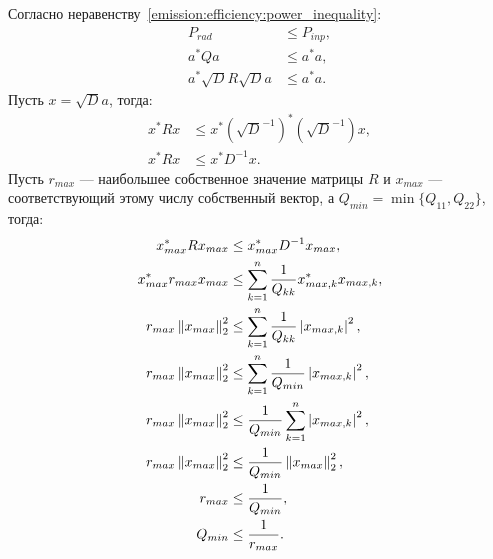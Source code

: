Согласно неравенству~\eqref{emission:efficiency:power_inequality}:
\begin{align*}
    P_{rad}                   & \le P_{inp} , \\
    a^* Q a                   & \le a^* a,    \\
    a^* \sqrt{D} R \sqrt{D} a & \le a^* a .
\end{align*}
Пусть $x = \sqrt{D} a$, тогда:
\begin{align*}
    x^* R x & \le x^* (\sqrt{D}^{-1})^* (\sqrt{D}^{-1}) x , \\
    x^* R x & \le x^* D^{-1} x .
\end{align*}
Пусть $r_{max}$ --- наибольшее собственное значение матрицы $R$ и $x_{max}$ --- соответствующий этому числу собственный вектор, а $Q_{min} = \min \{ Q_{11}, Q_{22} \}$,
тогда:
\begin{align*}
    x_{max}^* R x_{max}        & \le x_{max}^* D^{-1} x_{max} ,                             \\
    x_{max}^* r_{max} x_{max}  & \le \sum_{k=1}^n \frac{1}{Q_{kk}} x_{max,k}^* x_{max,k} ,  \\
    r_{max} \left \| x_{max} \right \|_2^2 & \le \sum_{k=1}^n \frac{1}{Q_{kk}} \left | x_{max,k} \right |^2 ,  \\
    r_{max} \left \| x_{max} \right \|_2^2 & \le \sum_{k=1}^n \frac{1}{Q_{min}} \left | x_{max,k} \right |^2 , \\
    r_{max} \left \| x_{max} \right \|_2^2 & \le \frac{1}{Q_{min}} \sum_{k=1}^n \left | x_{max,k} \right |^2 , \\
    r_{max} \left \| x_{max} \right \|_2^2 & \le \frac{1}{Q_{min}} \left \| x_{max} \right \|_2^2 ,                 \\
    r_{max}                    & \le \frac{1}{Q_{min}} ,                                    \\
    Q_{min}                    & \le \frac{1}{r_{max}} .
\end{align*}

